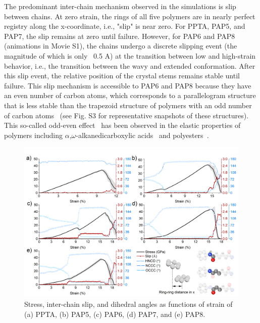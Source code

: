 \documentclass[journal=langd5,manuscript=article]{achemso}
\begin{document}
The predominant inter-chain mechanism observed in the simulations is slip between chains.
At zero strain, the rings of all five polymers are in nearly perfect registry along the x-coordinate, i.e., "slip" is near zero.
For PPTA, PAP5, and PAP7, the slip remains at zero until failure.
However, for PAP6 and PAP8 (animations in Movie S1), the chains undergo a discrete slipping event (the magnitude of which is only ~0.5 A) at the transition between low and high-strain behavior, i.e., the transition between the wavy and extended conformation.
After this slip event, the relative position of the crystal stems remains stable until failure.
This slip mechanism is accessible to PAP6 and PAP8 because they have an even number of carbon atoms, which corresponds to a parallelogram structure that is less stable than the trapezoid structure of polymers with an odd number of carbon atoms ~\cite{thalladi2000melting,white2008room,bond2004crystal}(see Fig. S3 for representative snapshots of these structures).
This so-called odd-even effect~\cite{baeyer1877ueber,thalladi2000melting} has been observed in the elastic properties of polymers including $\alpha$,$\omega$-alkanedicarboxylic acids~\cite{mishra2013odd} and polyesters~\cite{shen2017facile}.
\begin{figure}[h!]
\centering
\includegraphics[scale=0.55]{Slip-and-Rotation-vs-Strain.png}
\caption{Stress, inter-chain slip, and dihedral angles as functions of strain of (a) PPTA, (b) PAP5, (c) PAP6, (d) PAP7, and (e) PAP8.}
\label{fig:Slip-and-Rotation-vs-Strain}
\end{figure}



\FloatBarrier
\end{document}
